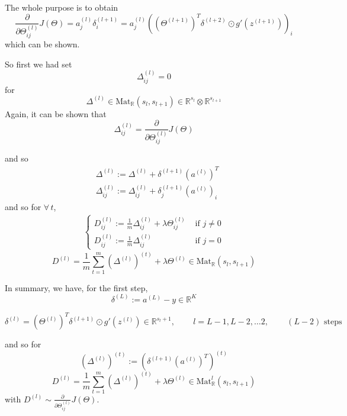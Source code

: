 \documentclass[10pt]{amsart}
\begin{document}
\begin{multicols*}{2}
The whole purpose is to obtain
\[
\frac{ \partial }{ \partial \Theta^{(l)}_{ij} } J(\Theta) = a_j^{(l)} \delta_i^{(l+1)} = a_j^{(l)} ( (\Theta^{(l+1)})^T \delta^{(l+2)} \odot g'(z^{(l+1)}) )_i  
\]
which can be shown.

So first we had set
\[
\Delta_{ij}^{(l)} = 0 
\]
for
\[
\Delta^{(l)} \in \text{Mat}_{\mathbb{R}}(s_l, s_{l+1} ) \in \mathbb{R}^{s_l} \otimes \mathbb{R}^{s_{l+1}} 
\]
Again, it can be shown that 
\begin{equation}
  \Delta_{ij}^{(l)} = \frac{ \partial }{ \partial \Theta^{(l)}_{ij} } J(\Theta)
  \end{equation}

and so
\[
\begin{aligned}
 & \Delta^{(l)} := \Delta^{(l)} + \delta^{(l+1)} (a^{(l)})^T \\ 
 & \Delta^{(l)}_{ij} := \Delta^{(l)}_{ij} + \delta^{(l+1)}_j (a^{(l)})_i 
\end{aligned}
\]
and so for $\forall \, t$,
\[
\begin{aligned}
\begin{cases}   D_{ij}^{(l)} := \frac{1}{m} \Delta_{ij}^{(l)} + \lambda \Theta_{ij}^{(l)} & \text{ if } j \neq 0 \\
  D_{ij}^{(l)} := \frac{1}{m} \Delta_{ij}^{(l)} & \text{ if } j = 0 \end{cases}
  \end{aligned}
\]
\[
D^{(l)} = \frac{1}{m} \sum_{t=1}^m (\Delta^{(l)})^{(t)} + \lambda \Theta^{(l)} \in \text{Mat}_{\mathbb{R}}(s_l,s_{l+1})
\]


In summary, we have, for the first step,
\begin{equation}
  \delta^{(L)} := a^{(L)} - y \in \mathbb{R}^K
  \end{equation}

\begin{equation}
  \delta^{(l)} = (\Theta^{(l)})^T \delta^{(l+1)} \odot g'(z^{(l)}) \in \mathbb{R}^{s_l + 1} , \qquad \, l = L-1,L-2, \dots 2, \qquad \, (L-2) \text{ steps } 
  \end{equation}

and so for
\begin{equation}
(\Delta^{(l)})^{(t)} := (\delta^{(l+1)}(a^{(l)})^T)^{(t)}
\end{equation}
\begin{equation}
D^{(l)} = \frac{1}{m} \sum_{t=1}^m (\Delta^{(l)})^{(t)}  + \lambda \Theta^{(l)} \in \text{Mat}^l_{\mathbb{R}}(s_l,s_{l+1})
\end{equation}
with $D^{(l)} \sim \frac{ \partial }{ \partial \Theta_{ij}^{(l)} } J(\Theta)$.


\end{multicols*}
\end{document}

